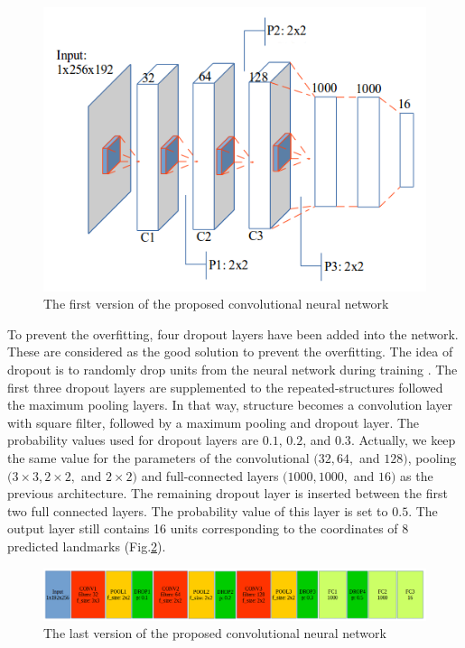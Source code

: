 \documentclass[10pt]{article}
\begin{document}
\begin{figure}[htbp]
\centering
\includegraphics[scale=0.45]{images/architecture1}
\caption{The first version of the proposed convolutional neural network} 
\label{cnnnetwork1}
\end{figure}


To prevent the overfitting, four dropout layers have been added into the network. These are considered as the good solution to prevent the overfitting. The idea of dropout is to randomly drop units from the neural network during training \cite{srivastava2014dropout}. The first three dropout layers are supplemented to the repeated-structures followed the maximum pooling layers. In that way, structure becomes a convolution layer with square filter, followed by a maximum pooling and dropout layer. The probability values used for dropout layers are $0.1$, $0.2$, and $0.3$. Actually, we keep the same value for the parameters of the convolutional $(32, 64,$ and $128)$, pooling $(3 \times 3, 2 \times 2,$ and $2 \times 2)$ and full-connected layers $(1000, 1000,$ and $16)$ as the previous architecture. 
The remaining dropout layer is inserted between the first
two full connected layers. The probability value of this layer
is set to $0.5$. The output layer still contains 16 units corresponding to the coordinates of 8 predicted landmarks (Fig.\ref{cnnnetwork2}).

\begin{figure}[!t]
\centering
\includegraphics[scale=0.4]{images/model_arch}
\caption{The last version of the proposed convolutional neural network} 
\label{cnnnetwork2}
\end{figure}
\end{document}
